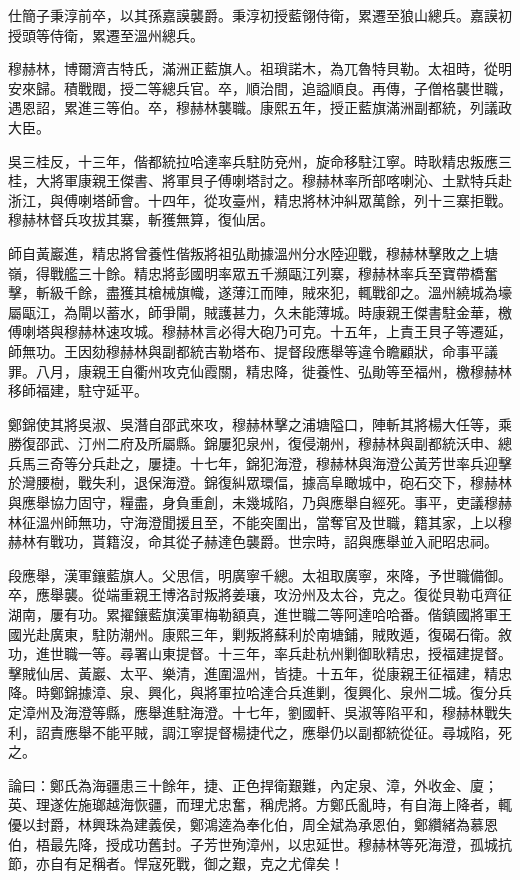 \begin{pinyinscope}
仕簡子秉淳前卒，以其孫嘉謨襲爵。秉淳初授藍翎侍衛，累遷至狼山總兵。嘉謨初授頭等侍衛，累遷至溫州總兵。

穆赫林，博爾濟吉特氏，滿洲正藍旗人。祖瑣諾木，為兀魯特貝勒。太祖時，從明安來歸。積戰閥，授二等總兵官。卒，順治間，追謚順良。再傳，子僧格襲世職，遇恩詔，累進三等伯。卒，穆赫林襲職。康熙五年，授正藍旗滿洲副都統，列議政大臣。

吳三桂反，十三年，偕都統拉哈達率兵駐防兗州，旋命移駐江寧。時耿精忠叛應三桂，大將軍康親王傑書、將軍貝子傅喇塔討之。穆赫林率所部喀喇沁、土默特兵赴浙江，與傅喇塔師會。十四年，從攻臺州，精忠將林沖糾眾萬餘，列十三寨拒戰。穆赫林督兵攻拔其寨，斬獲無算，復仙居。

師自黃巖進，精忠將曾養性偕叛將祖弘勛據溫州分水陸迎戰，穆赫林擊敗之上塘嶺，得戰艦三十餘。精忠將彭國明率眾五千瀕甌江列寨，穆赫林率兵至寶帶橋奮擊，斬級千餘，盡獲其槍械旗幟，遂薄江而陣，賊來犯，輒戰卻之。溫州繞城為壕屬甌江，為閘以蓄水，師爭閘，賊護甚力，久未能薄城。時康親王傑書駐金華，檄傅喇塔與穆赫林速攻城。穆赫林言必得大砲乃可克。十五年，上責王貝子等遷延，師無功。王因劾穆赫林與副都統吉勒塔布、提督段應舉等違令瞻顧狀，命事平議罪。八月，康親王自衢州攻克仙霞關，精忠降，徙養性、弘勛等至福州，檄穆赫林移師福建，駐守延平。

鄭錦使其將吳淑、吳潛自邵武來攻，穆赫林擊之浦塘隘口，陣斬其將楊大任等，乘勝復邵武、汀州二府及所屬縣。錦屢犯泉州，復侵潮州，穆赫林與副都統沃申、總兵馬三奇等分兵赴之，屢捷。十七年，錦犯海澄，穆赫林與海澄公黃芳世率兵迎擊於灣腰樹，戰失利，退保海澄。錦復糾眾環偪，據高阜瞰城中，砲石交下，穆赫林與應舉協力固守，糧盡，身負重創，未幾城陷，乃與應舉自經死。事平，吏議穆赫林征溫州師無功，守海澄聞援且至，不能突圍出，當奪官及世職，籍其家，上以穆赫林有戰功，貰籍沒，命其從子赫達色襲爵。世宗時，詔與應舉並入祀昭忠祠。

段應舉，漢軍鑲藍旗人。父思信，明廣寧千總。太祖取廣寧，來降，予世職備御。卒，應舉襲。從端重親王博洛討叛將姜瓖，攻汾州及太谷，克之。復從貝勒屯齊征湖南，屢有功。累擢鑲藍旗漢軍梅勒額真，進世職二等阿達哈哈番。偕鎮國將軍王國光赴廣東，駐防潮州。康熙三年，剿叛將蘇利於南塘鋪，賊敗遁，復碣石衛。敘功，進世職一等。尋署山東提督。十三年，率兵赴杭州剿御耿精忠，授福建提督。擊賊仙居、黃巖、太平、樂清，進圍溫州，皆捷。十五年，從康親王征福建，精忠降。時鄭錦據漳、泉、興化，與將軍拉哈達合兵進剿，復興化、泉州二城。復分兵定漳州及海澄等縣，應舉進駐海澄。十七年，劉國軒、吳淑等陷平和，穆赫林戰失利，詔責應舉不能平賊，調江寧提督楊捷代之，應舉仍以副都統從征。尋城陷，死之。

論曰：鄭氏為海疆患三十餘年，捷、正色捍衛艱難，內定泉、漳，外收金、廈；英、理遂佐施瑯越海恢疆，而理尤忠奮，稱虎將。方鄭氏亂時，有自海上降者，輒優以封爵，林興珠為建義侯，鄭鴻逵為奉化伯，周全斌為承恩伯，鄭纘緒為慕恩伯，梧最先降，授成功舊封。子芳世殉漳州，以忠延世。穆赫林等死海澄，孤城抗節，亦自有足稱者。悍寇死戰，御之艱，克之尤偉矣！


\end{pinyinscope}